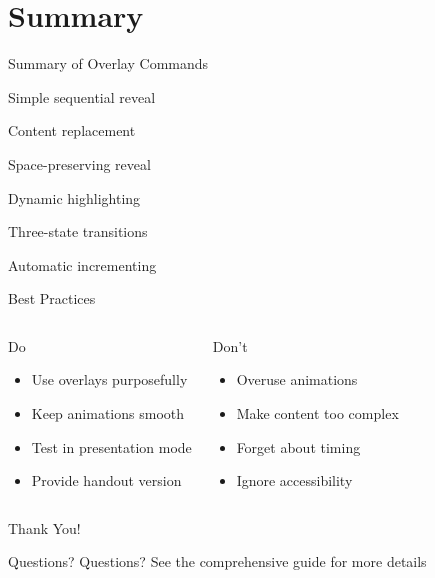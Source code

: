 \documentclass{beamer}
\begin{document}
\section{Summary}

\begin{frame}{Summary of Overlay Commands}
    \begin{description}[<+->]
        \item[\textbackslash pause] Simple sequential reveal
        \item[\textbackslash only] Content replacement
        \item[\textbackslash uncover] Space-preserving reveal
        \item[\textbackslash alert] Dynamic highlighting
        \item[\textbackslash temporal] Three-state transitions
        \item[<+->] Automatic incrementing
    \end{description}
\end{frame}

\begin{frame}{Best Practices}
    \begin{columns}[t]
        \begin{block}{Do}
            \begin{itemize}[<+->]
                \item Use overlays purposefully
                \item Keep animations smooth
                \item Test in presentation mode
                \item Provide handout version
            \end{itemize}
        \end{block}
        
        \begin{block}{Don't}
            \begin{itemize}[<+->]
                \item Overuse animations
                \item Make content too complex
                \item Forget about timing
                \item Ignore accessibility
            \end{itemize}
        \end{block}
    \end{columns}
\end{frame}

\begin{frame}
    \begin{center}
        \Huge Thank You!
        
        \vspace{1cm}
        
        \large
            {Questions?}
            {\color{red}Questions?}
            {See the comprehensive guide for more details}
    \end{center}
\end{frame}
\end{document}
